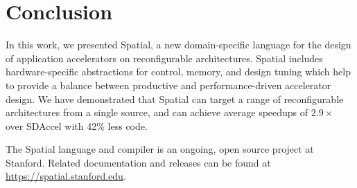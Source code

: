 \section{Conclusion}
\label{conclusion}

In this work, we presented Spatial, a new domain-specific language for the design of application accelerators on reconfigurable architectures.
Spatial includes hardware-specific abstractions for control, memory, and design tuning which help to provide a balance 
between productive and performance-driven accelerator design.
We have demonstrated that Spatial can target a range of reconfigurable architectures from a single source, and can achieve average
speedups of $2.9\times$ over SDAccel with 42\% less code. 

The Spatial language and compiler is an ongoing, open source project at Stanford. Related documentation and releases can be found at \url{https://spatial.stanford.edu}.
